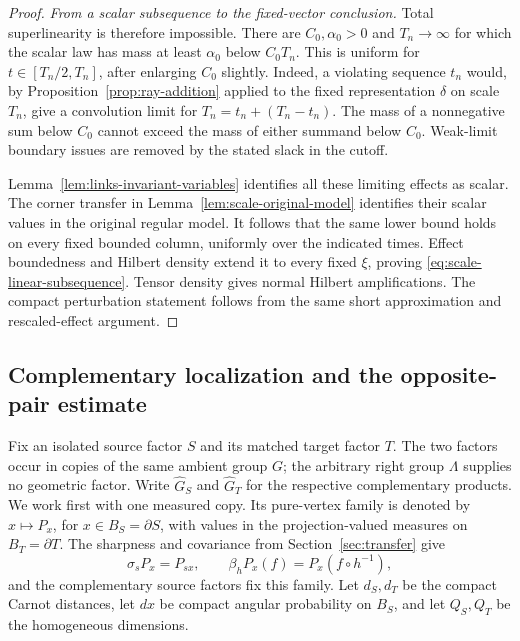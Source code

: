 \begin{proof}
\emph{From a scalar subsequence to the fixed-vector conclusion.}
Total superlinearity is therefore impossible. There
are \(C_0,\alpha_0>0\) and \(T_n\to\infty\) for which
the scalar law has mass at least \(\alpha_0\) below
\(C_0T_n\).  This is uniform for
\(t\in[T_n/2,T_n]\), after enlarging \(C_0\) slightly.
Indeed, a violating sequence \(t_n\) would, by
Proposition~\ref{prop:ray-addition} applied to the fixed
representation \(\delta\) on scale \(T_n\), give a
convolution limit for \(T_n=t_n+(T_n-t_n)\).
The mass of a nonnegative sum below \(C_0\) cannot
exceed the mass of either summand below \(C_0\).
Weak-limit boundary issues are removed by the stated
slack in the cutoff.

Lemma~\ref{lem:links-invariant-variables} identifies all
these limiting effects as scalar.  The corner transfer
in Lemma~\ref{lem:scale-original-model} identifies
their scalar values in the original regular model.
It follows that the same lower bound holds on every
fixed bounded column, uniformly over the indicated
times.  Effect boundedness and Hilbert density extend
it to every fixed \(\xi\), proving
\eqref{eq:scale-linear-subsequence}.  Tensor density
gives normal Hilbert amplifications.  The compact
perturbation statement follows from the same short
approximation and rescaled-effect argument.
\end{proof}

\subsection{Complementary localization and the opposite-pair estimate}

Fix an isolated source factor $S$ and its matched target factor $T$.
The two factors occur in copies of the same ambient group $G$; the
arbitrary right group $\Lambda$ supplies no geometric factor. Write
$\widehat G_S$ and $\widehat G_T$ for the respective complementary
products. We work first with one measured copy. Its pure-vertex
family is denoted by $x\mapsto P_x$, for $x\in B_S=\partial S$,
with values in the projection-valued measures on $B_T=\partial T$.
The sharpness and covariance from Section~\ref{sec:transfer} give
\[
 \sigma_sP_x=P_{sx},\qquad
 \beta_hP_x(f)=P_x(f\circ h^{-1}),
\]
and the complementary source factors fix this family. Let $d_S,d_T$
be the compact Carnot distances, let $dx$ be compact angular probability
on $B_S$, and let $Q_S,Q_T$ be the homogeneous dimensions.

